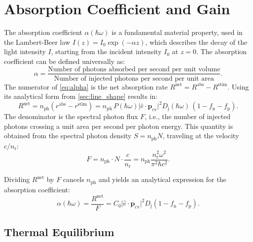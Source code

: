 \section{Absorption Coefficient and Gain}
\label{sec:absorption_coefficient_and_gain}

The absorption coefficient $\alpha(\hbar \omega)$ is a fundamental material property,
used in the Lambert-Beer law $I(z)=I_{0}\exp(-\alpha z)$, which describes the decay
of the light intensity $I$, starting from the
incident intensity $I_{0}$ at $z=0$. The absorption
coefficient can be defined universally as:
\begin{equation}
	\alpha =\frac{\text{Number of photons absorbed per second per unit volume}}{\text{Number
	of injected photons per second per unit area}}.\label{eq:alpha}
\end{equation}
The numerator of \cref{eq:alpha} is the net absorption rate
$R^{\mathrm{net}}=R^{\mathrm{abs}}- R^{\mathrm{stim}}$. Using its analytical form from \cref{sec:line_shape}
results in:
\begin{equation}
	R^{\mathrm{net}}=n_{\mathrm{ph}}(r^{\mathrm{abs}}-r^{\mathrm{stim}}) = n_{\mathrm{ph}}
	\, P(\hbar\omega) \lvert \hat{e}\cdot \mathbf{p}_{\mathrm{cv}}\rvert^{2}D_{\mathrm{j}}
	(\hbar\omega)\,(1-f_{\mathrm{n}}-f_{\mathrm{p}}).
\end{equation}
The denominator is the spectral photon flux $F$, i.e., the number of injected photons
crossing a unit area per second per photon energy. This quantity is obtained from
the spectral photon density $S=n_{\mathrm{ph}}N$, traveling at the velocity
$c/n_{\mathrm{r}}$:
\begin{equation}
	F=n_{\mathrm{ph}}\cdot N \cdot \frac{c}{n_{\mathrm{r}}}= n_{\mathrm{ph}}\frac{n_{\mathrm{r}}^{2}\omega^{2}}{\pi^{2}\hbar
	c^{2}}.
\end{equation}

Dividing $R^{\mathrm{net}}$ by $F$ cancels $n_{\mathrm{ph}}$ and yields an
analytical expression for the absorption coefficient:
\begin{equation}
	\alpha(\hbar \omega)=\frac{R^{\mathrm{net}}}{F}=C_{0}\lvert \hat{e}\cdot\mathbf{p}
	_{\mathrm{cv}}\rvert^{2}D_{\mathrm{j}}(1-f_{\mathrm{n}}-f_{\mathrm{p}}). \label{eq:alpha_analytical}
\end{equation}

\subsection{Thermal Equilibrium}


